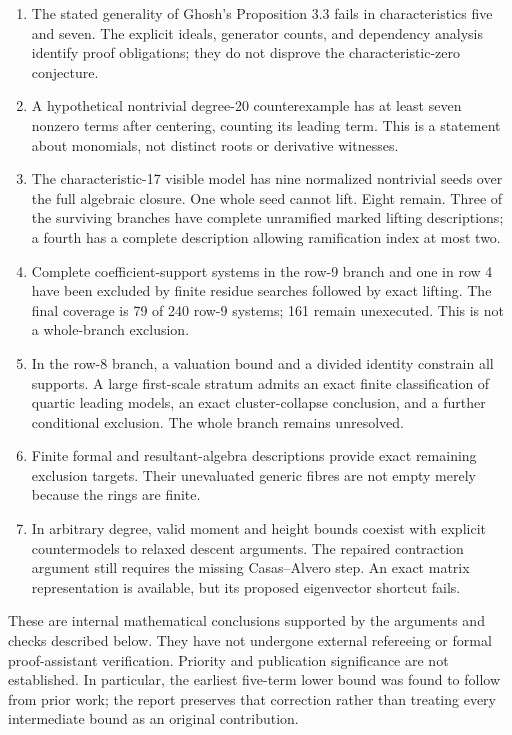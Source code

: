 \documentclass[
  british,
  10pt,
]{article}
\providecommand{\tightlist}{%
  \setlength{\itemsep}{0pt}\setlength{\parskip}{0pt}}
\begin{document}
\begin{enumerate}
\def\labelenumi{\arabic{enumi}.}
\tightlist
\item
  The stated generality of Ghosh's Proposition 3.3 fails in
  characteristics five and seven. The explicit ideals, generator counts,
  and dependency analysis identify proof obligations; they do not
  disprove the characteristic-zero conjecture.
\item
  A hypothetical nontrivial degree-20 counterexample has at least seven
  nonzero terms after centering, counting its leading term. This is a
  statement about monomials, not distinct roots or derivative witnesses.
\item
  The characteristic-17 visible model has nine normalized nontrivial
  seeds over the full algebraic closure. One whole seed cannot lift.
  Eight remain. Three of the surviving branches have complete unramified
  marked lifting descriptions; a fourth has a complete description
  allowing ramification index at most two.
\item
  Complete coefficient-support systems in the row-9 branch and one in
  row 4 have been excluded by finite residue searches followed by exact
  lifting. The final coverage is 79 of 240 row-9 systems; 161 remain
  unexecuted. This is not a whole-branch exclusion.
\item
  In the row-8 branch, a valuation bound and a divided identity
  constrain all supports. A large first-scale stratum admits an exact
  finite classification of quartic leading models, an exact
  cluster-collapse conclusion, and a further conditional exclusion. The
  whole branch remains unresolved.
\item
  Finite formal and resultant-algebra descriptions provide exact
  remaining exclusion targets. Their unevaluated generic fibres are not
  empty merely because the rings are finite.
\item
  In arbitrary degree, valid moment and height bounds coexist with
  explicit countermodels to relaxed descent arguments. The repaired
  contraction argument still requires the missing Casas--Alvero step. An
  exact matrix representation is available, but its proposed eigenvector
  shortcut fails.
\end{enumerate}

These are internal mathematical conclusions supported by the arguments
and checks described below. They have not undergone external refereeing
or formal proof-assistant verification. Priority and publication
significance are not established. In particular, the earliest five-term
lower bound was found to follow from prior work; the report preserves
that correction rather than treating every intermediate bound as an
original contribution.
\end{document}
